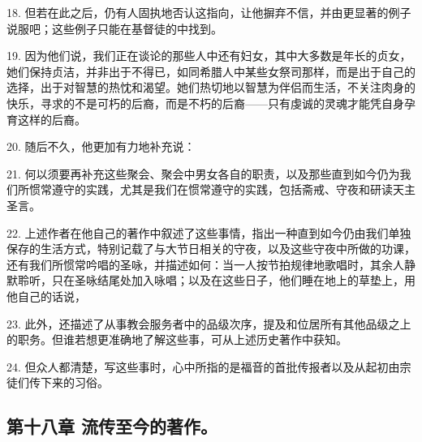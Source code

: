 18. 但若在此之后，仍有人固执地否认这指向，让他摒弃不信，并由更显著的例子说服吧；这些例子只能在基督徒的中找到。\par

19. 因为他们说，我们正在谈论的那些人中还有妇女，其中大多数是年长的贞女，她们保持贞洁，并非出于不得已，如同希腊人中某些女祭司那样，而是出于自己的选择，出于对智慧的热忱和渴望。她们热切地以智慧为伴侣而生活，不关注肉身的快乐，寻求的不是可朽的后裔，而是不朽的后裔——只有虔诚的灵魂才能凭自身孕育这样的后裔。\par

20. 随后不久，他更加有力地补充说：\par

21. 何以须要再补充这些聚会、聚会中男女各自的职责，以及那些直到如今仍为我们所惯常遵守的实践，尤其是我们在惯常遵守的实践，包括斋戒、守夜和研读天主圣言。\par

22. 上述作者在他自己的著作中叙述了这些事情，指出一种直到如今仍由我们单独保存的生活方式，特别记载了与大节日相关的守夜，以及这些守夜中所做的功课，还有我们所惯常吟唱的圣咏，并描述如何：当一人按节拍规律地歌唱时，其余人静默聆听，只在圣咏结尾处加入咏唱；以及在这些日子，他们睡在地上的草垫上，用他自己的话说，\par

23. 此外，还描述了从事教会服务者中的品级次序，提及和位居所有其他品级之上的职务。但谁若想更准确地了解这些事，可从上述历史著作中获知。\par

24. 但众人都清楚，写这些事时，心中所指的是福音的首批传报者以及从起初由宗徒们传下来的习俗。\par


\subsection{第十八章 流传至今的著作。}

